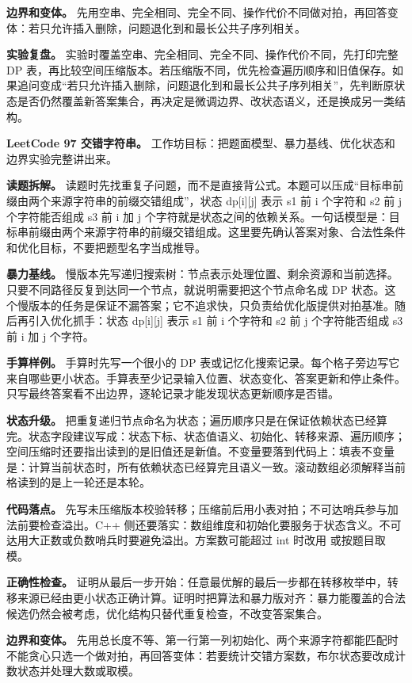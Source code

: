 \textbf{边界和变体。} 先用空串、完全相同、完全不同、操作代价不同做对拍，再回答变体：若只允许插入删除，问题退化到和最长公共子序列相关。

\textbf{实验复盘。} 实验时覆盖空串、完全相同、完全不同、操作代价不同，先打印完整 DP 表，再比较空间压缩版本。若压缩版不同，优先检查遍历顺序和旧值保存。如果追问变成“若只允许插入删除，问题退化到和最长公共子序列相关”，先判断原状态是否仍然覆盖新答案集合，再决定是微调边界、改状态语义，还是换成另一类结构。

\noindent\textbf{LeetCode 97 交错字符串。} 工作坊目标：把题面模型、暴力基线、优化状态和边界实验完整讲出来。

\textbf{读题拆解。} 读题时先找重复子问题，而不是直接背公式。本题可以压成“目标串前缀由两个来源字符串的前缀交错组成”，状态 dp[i][j] 表示 s1 前 i 个字符和 s2 前 j 个字符能否组成 s3 前 i 加 j 个字符就是状态之间的依赖关系。一句话模型是：目标串前缀由两个来源字符串的前缀交错组成。这里要先确认答案对象、合法性条件和优化目标，不要把题型名字当成推导。

\textbf{暴力基线。} 慢版本先写递归搜索树：节点表示处理位置、剩余资源和当前选择。只要不同路径反复到达同一个节点，就说明需要把这个节点命名成 DP 状态。这个慢版本的任务是保证不漏答案；它不追求快，只负责给优化版提供对拍基准。随后再引入优化抓手：状态 dp[i][j] 表示 s1 前 i 个字符和 s2 前 j 个字符能否组成 s3 前 i 加 j 个字符。

\textbf{手算样例。} 手算时先写一个很小的 DP 表或记忆化搜索记录。每个格子旁边写它来自哪些更小状态。手算表至少记录输入位置、状态变化、答案更新和停止条件。只写最终答案看不出边界，逐轮记录才能发现状态更新顺序是否错。

\textbf{状态升级。} 把重复递归节点命名为状态；遍历顺序只是在保证依赖状态已经算完。状态字段建议写成：状态下标、状态值语义、初始化、转移来源、遍历顺序；空间压缩时还要指出读到的是旧值还是新值。不变量要落到代码上：填表不变量是：计算当前状态时，所有依赖状态已经算完且语义一致。滚动数组必须解释当前格读到的是上一轮还是本轮。

\textbf{代码落点。} 先写未压缩版本校验转移；压缩前后用小表对拍；不可达哨兵参与加法前要检查溢出。C++ 侧还要落实：数组维度和初始化要服务于状态含义。不可达用大正数或负数哨兵时要避免溢出。方案数可能超过 int 时改用  或按题目取模。

\textbf{正确性检查。} 证明从最后一步开始：任意最优解的最后一步都在转移枚举中，转移来源已经由更小状态正确计算。证明时把算法和暴力版对齐：暴力能覆盖的合法候选仍然会被考虑，优化结构只替代重复检查，不改变答案集合。

\textbf{边界和变体。} 先用总长度不等、第一行第一列初始化、两个来源字符都能匹配时不能贪心只选一个做对拍，再回答变体：若要统计交错方案数，布尔状态要改成计数状态并处理大数或取模。

